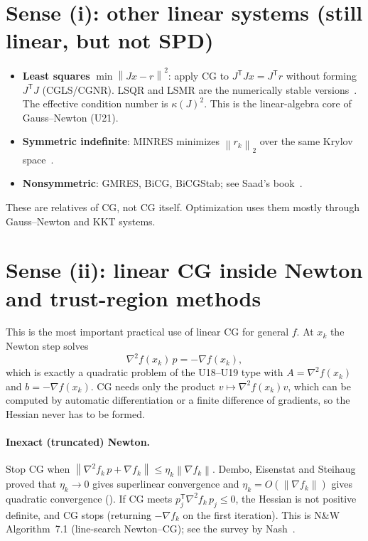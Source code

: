 \documentclass[11pt,a4paper]{article}
\theoremstyle{remark}
\newcommand{\norm}[1]{\left\lVert #1\right\rVert}
\newcommand{\T}{^{\mathsf T}}
\begin{document}
\section{Sense (i): other linear systems (still linear, but not SPD)}
\begin{itemize}[leftmargin=1.5em]
\item \textbf{Least squares} $\min\norm{Jx-r}^2$: apply CG to $J\T Jx=J\T r$ without forming $J\T J$ (CGLS/CGNR). LSQR and LSMR are the numerically stable versions~\cite{PaigeSaunders1982,FongSaunders2011}. The effective condition number is $\kappa(J)^2$. This is the linear-algebra core of Gauss--Newton (U21).
\item \textbf{Symmetric indefinite}: MINRES minimizes $\norm{r_k}_2$ over the same Krylov space~\cite{PaigeSaunders1975}.
\item \textbf{Nonsymmetric}: GMRES, BiCG, BiCGStab; see Saad's book~\cite{Saad2003}.
\end{itemize}
These are relatives of CG, not CG itself. Optimization uses them mostly through Gauss--Newton and KKT systems.

\section{Sense (ii): linear CG inside Newton and trust-region methods}
\label{sec:newtoncg}
This is the most important practical use of linear CG for general $f$. At $x_k$ the Newton step solves
\[
\nabla^2 f(x_k)\,p = -\nabla f(x_k),
\]
which is exactly a quadratic problem of the U18--U19 type with $A=\nabla^2 f(x_k)$ and $b=-\nabla f(x_k)$. CG needs only the product $v\mapsto\nabla^2 f(x_k)v$, which can be computed by automatic differentiation or a finite difference of gradients, so the Hessian never has to be formed.

\paragraph{Inexact (truncated) Newton.} Stop CG when $\norm{\nabla^2 f_k\,p+\nabla f_k}\le\eta_k\norm{\nabla f_k}$. Dembo, Eisenstat and Steihaug~\cite{DemboEisenstatSteihaug1982} proved that $\eta_k\to0$ gives superlinear convergence and $\eta_k=O(\norm{\nabla f_k})$ gives quadratic convergence (\cite[Thm.~7.2]{NocedalWright2006}). If CG meets $p_j\T\nabla^2 f_k\,p_j\le0$, the Hessian is not positive definite, and CG stops (returning $-\nabla f_k$ on the first iteration). This is N\&W Algorithm~7.1 (line-search Newton--CG); see the survey by Nash~\cite{Nash2000}.
\end{document}
